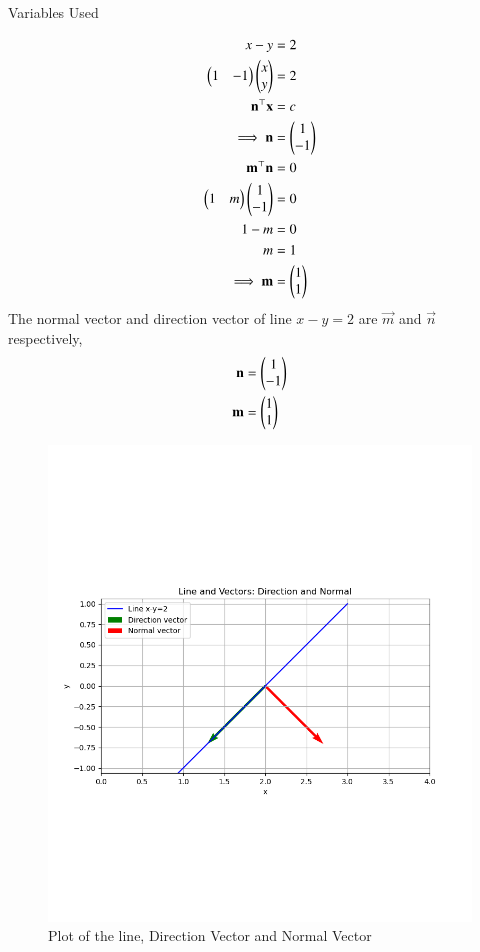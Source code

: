 \documentclass[journal]{IEEEtran}
\begin{document}
\solution
\begin{table}[h!]    
  \centering
  
  \caption{Variables Used}
  \label{tab4.2.10.1}
\end{table}
\begin{align}
    x-y&=2 \\
    \begin{pmatrix}1 & -1\end{pmatrix}\begin{pmatrix}x \\ y\end{pmatrix}&=2 \\
    \mathbf{n}^\top\mathbf{x}&=c \\
    \implies\mathbf{n}&=\begin{pmatrix}1 \\ -1\end{pmatrix} \\
    \mathbf{m}^\top\mathbf{n}&=0 \\
    \begin{pmatrix}1 & m\end{pmatrix}\begin{pmatrix}1 \\ -1\end{pmatrix}&=0 \\
    1-m&=0 \\
    m&=1 \\
    \implies \mathbf{m}&=\begin{pmatrix}1 \\ 1\end{pmatrix}
\end{align}
The normal vector and direction vector of line $x-y=2$ are $\vec{m}$ and $\vec{n}$ respectively,
\begin{align}
    \mathbf{n}&=\begin{pmatrix}1 \\ -1\end{pmatrix} \\
    \mathbf{m}&=\begin{pmatrix}1 \\ 1\end{pmatrix}
\end{align}
\begin{figure}[ht!]
	\centering
   	\includegraphics[width=0.8\linewidth]{figs/fig.png}
   	\caption{Plot of the line, Direction Vector and Normal Vector}
\label{Plot}
\end{figure}
\end{document}
